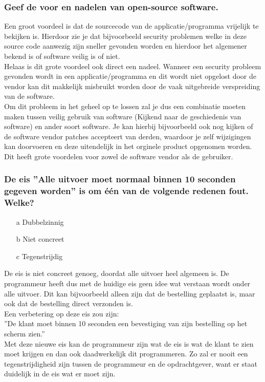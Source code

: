 \documentclass[a4paper,titlepage]{artikel1}
\begin{document}
   \subsubsection[Opdracht 7]{Geef de voor en nadelen van open-source software.}
   Een groot voordeel is dat de sourcecode van de applicatie/programma vrijelijk te bekijken is. Hierdoor zie je dat bijvoorbeeld security problemen welke in deze source code aanwezig zijn sneller gevonden worden en hierdoor het algemener bekend is of software veilig is of niet.
   \\
   Helaas is dit grote voordeel ook direct een nadeel. Wanneer een security probleem gevonden wordt in een applicatie/programma en dit wordt niet opgelost door de vendor kan dit makkelijk misbruikt worden door de vaak uitgebreide verspreiding van de software. 
   \\ 
   Om dit probleem in het geheel op te lossen zal je dus een combinatie moeten maken tussen veilig gebruik van software (Kijkend naar de geschiedenis van software) en ander soort software. Je kan hierbij bijvoorbeeld ook nog kijken of de software vendor patches accepteert van derden, waardoor je zelf wijzigingen kan doorvoeren en deze uitendelijk in het orginele product opgenomen worden. Dit heeft grote voordelen voor zowel de software vendor als de gebruiker.
   
   \subsubsection[Opdracht 8]{De eis ''Alle uitvoer moet normaal binnen 10 seconden gegeven worden'' is om \'{e}\'{e}n van de volgende redenen fout. Welke?}
   \begin{itemize}
    \item[a] Dubbelzinnig
    \item[b] Niet concreet
    \item[c] Tegenstrijdig
   \end{itemize}
   De eis is niet concreet genoeg, doordat alle uitvoer heel algemeen is. De programmeur heeft dus met de huidige eis geen idee wat verstaan wordt onder alle uitvoer. Dit kan bijvoorbeeld alleen zijn dat de bestelling geplaatst is, maar ook dat de bestelling direct verzonden is. \\Een verbetering op deze eis zou zijn:\\
   ''De klant moet binnen 10 seconden een bevestiging van zijn bestelling op het scherm zien.''\\
   Met deze nieuwe eis kan de programmeur zijn wat de eis is wat de klant te zien moet krijgen en dan ook daadwerkelijk dit programmeren. Zo zal er nooit een tegenstrijdigheid zijn tussen de programmeur en de opdrachtgever, want er staat duidelijk in de eis wat er moet zijn.
   
\end{document}
